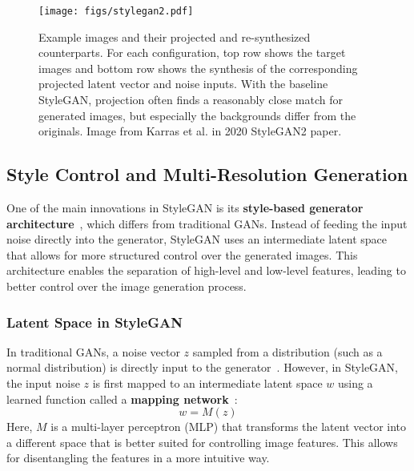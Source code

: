 \begin{figure}[htbp]
    \centering
    \texttt{[image: figs/stylegan2.pdf]}
    \caption{Example images and their projected and re-synthesized counterparts. For each configuration, top row shows the target images
    and bottom row shows the synthesis of the corresponding projected latent vector and noise inputs. With the baseline StyleGAN, projection
    often finds a reasonably close match for generated images, but especially the backgrounds differ from the originals. Image from Karras et al.\cite{karras2020analyzing} in 2020 StyleGAN2 paper.}
\end{figure}

\subsection{Style Control and Multi-Resolution Generation}

One of the main innovations in StyleGAN is its \textbf{style-based generator architecture}~\cite{karras2020analyzing}, which differs from traditional GANs. Instead of feeding the input noise directly into the generator, StyleGAN uses an intermediate latent space that allows for more structured control over the generated images. This architecture enables the separation of high-level and low-level features, leading to better control over the image generation process.

\subsubsection{Latent Space in StyleGAN}
In traditional GANs, a noise vector \( z \) sampled from a distribution (such as a normal distribution) is directly input to the generator~\cite{abdal2019image2stylegan}. However, in StyleGAN, the input noise \( z \) is first mapped to an intermediate latent space \( w \) using a learned function called a \textbf{mapping network}~\cite{karras2020analyzing}:
\[
w = M(z)
\]
Here, \( M \) is a multi-layer perceptron (MLP) that transforms the latent vector into a different space that is better suited for controlling image features. This allows for disentangling the features in a more intuitive way.

